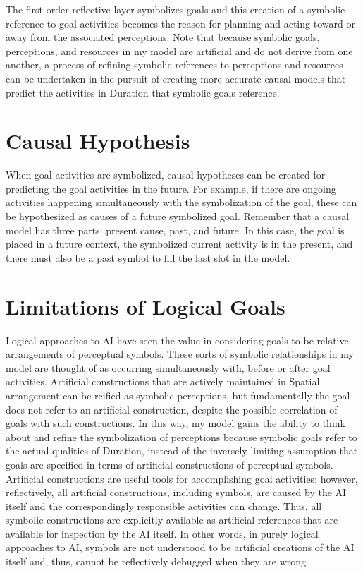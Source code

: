 The first-order reflective layer symbolizes goals and this creation of
a symbolic reference to goal activities becomes the reason for
planning and acting toward or away from the associated perceptions.
Note that because symbolic goals, perceptions, and resources in my
model are artificial and do not derive from one another, a process of
refining symbolic references to perceptions and resources can be
undertaken in the pursuit of creating more accurate causal models that
predict the activities in Duration that symbolic goals reference.

\section{Causal Hypothesis}

When goal activities are symbolized, causal hypotheses can be created
for predicting the goal activities in the future.  For example, if
there are ongoing activities happening simultaneously with the
symbolization of the goal, these can be hypothesized as causes of a
future symbolized goal.  Remember that a causal model has three parts:
present cause, past, and future.  In this case, the goal is placed in
a future context, the symbolized current activity is in the present,
and there must also be a past symbol to fill the last slot in the
model.

\section{Limitations of Logical Goals}

Logical approaches to AI have seen the value in considering goals to
be relative arrangements of perceptual symbols.  These sorts of
symbolic relationships in my model are thought of as occurring
simultaneously with, before or after goal activities.  Artificial
constructions that are actively maintained in Spatial arrangement can
be reified as symbolic perceptions, but fundamentally the goal does
not refer to an artificial construction, despite the possible
correlation of goals with such constructions.  In this way, my model
gains the ability to think about and refine the symbolization of
perceptions because symbolic goals refer to the actual qualities of
Duration, instead of the inversely limiting assumption that goals are
specified in terms of artificial constructions of perceptual symbols.
Artificial constructions are useful tools for accomplishing goal
activities; however, reflectively, all artificial constructions,
including symbols, are caused by the AI itself and the correspondingly
responsible activities can change.  Thus, all symbolic constructions
are explicitly available as artificial references that are available
for inspection by the AI itself.  In other words, in purely logical
approaches to AI, symbols are not understood to be artificial
creations of the AI itself and, thus, cannot be reflectively debugged
when they are wrong.

